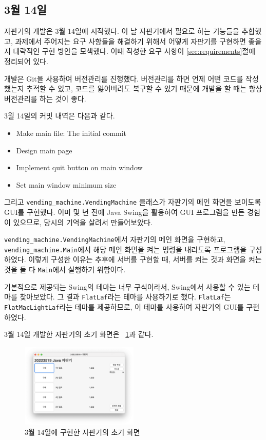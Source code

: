 \documentclass{oblivoir}
\newcommand{\figref}[1]{\figurename~\ref{#1}}
\begin{document}
    \subsection{3월 14일}

    자판기의 개발은 3월 14일에 시작했다.
    이 날 자판기에서 필요로 하는 기능들을 추합했고,
    과제에서 주어지는 요구 사항들을 해결하기 위해서 어떻게 자판기를 구현하면 좋을지 대략적인 구현 방안을 모색했다.
    이때 작성한 요구 사항이 \ref{sec:requirements}절에 정리되어 있다.

    개발은 Git을 사용하여 버전관리를 진행했다.
    버전관리를 하면 언제 어떤 코드를 작성했는지 추적할 수 있고, 코드를 잃어버려도 복구할 수 있기 때문에
    개발을 할 때는 항상 버전관리를 하는 것이 좋다.

    3월 14일의 커밋 내역은 다음과 같다.

    \begin{itemize}
        \item Make main file: The initial commit
        \item Design main page
        \item Implement quit button on main window
        \item Set main window minimum size
    \end{itemize}

    그리고 \texttt{vending\_machine.VendingMachine} 클래스가 자판기의 메인 화면을 보이도록 GUI를 구현했다.
    이미 몇 년 전에 Java Swing을 활용하여 GUI 프로그램을 만든 경험이 있으므로,
    당시의 기억을 살려서 만들어보았다.

    \texttt{vending\_machine.VendingMachine}에서 자판기의 메인 화면을 구현하고,
    \texttt{vending\_machine.Main}에서 해당 메인 화면을 켜는 명령을 내리도록 프로그램을 구성하였다.
    이렇게 구성한 이유는 추후에 서버를 구현할 때,
    서버를 켜는 것과 화면을 켜는 것을 둘 다 \texttt{Main}에서 실행하기 위함이다.

    기본적으로 제공되는 Swing의 테마는 너무 구식이라서, Swing에서 사용할 수 있는 테마를 찾아보았다.
    그 결과 \texttt{FlatLaf}라는 테마를 사용하기로 했다.
    \texttt{FlatLaf}는 \texttt{FlatMacLightLaf}라는 테마를 제공하므로,
    이 테마를 사용하여 자판기의 GUI를 구현하였다.

    3월 14일 개발한 자판기의 초기 화면은 \figref{fig:0314-vending-machine}과 같다.

    \begin{figure}[h]
        \centering
        \includegraphics[width=0.5\textwidth]{0314-vending-machine}
        \caption{3월 14일에 구현한 자판기의 초기 화면}
        \label{fig:0314-vending-machine}
    \end{figure}
\end{document}
